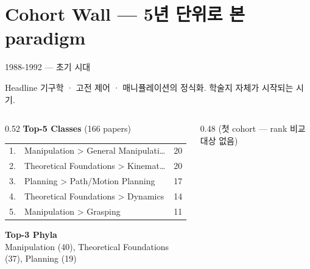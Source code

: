 \documentclass[aspectratio=169,t]{beamer}
\newcommand{\muted}[1]{\textcolor{mutedgray}{#1}}
\begin{document}
\section{Cohort Wall — 5년 단위로 본 paradigm}


\begin{frame}{1988-1992 \quad — \quad 초기 시대}
\small
\begin{block}{Headline}
기구학 · 고전 제어 · 매니퓰레이션의 정식화. 학술지 자체가 시작되는 시기.
\end{block}
\vspace{4pt}

\begin{columns}[T,onlytextwidth]
\begin{column}{0.52\textwidth}
\textbf{Top-5 Classes} \muted{\scriptsize (166 papers)}\\[2pt]
\scriptsize
\begin{tabular}{@{}rlr@{}}
    1. & Manipulation > General Manipulati… & 20 \\
    2. & Theoretical Foundations > Kinemat… & 20 \\
    3. & Planning > Path/Motion Planning & 17 \\
    4. & Theoretical Foundations > Dynamics & 14 \\
    5. & Manipulation > Grasping & 11 \\
\end{tabular}
\vspace{8pt}

\textbf{\small Top-3 Phyla}\\[2pt]
\scriptsize Manipulation (40), Theoretical Foundations (37), Planning (19)
\end{column}

\begin{column}{0.48\textwidth}
\muted{\small (첫 cohort — rank 비교 대상 없음)}
\end{column}
\end{columns}
\end{frame}
\end{document}
